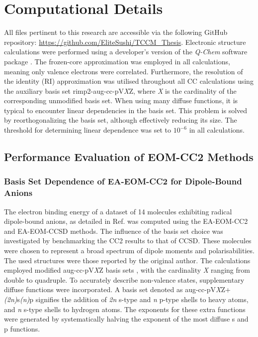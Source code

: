 \chapter{Computational Details}\label{ch:methods}

All files pertinent to this research are accessible via the following GitHub repository: \url{https://github.com/EliteSushi/TCCM_Thesis}. Electronic structure calculations were performed using a developer's version of the \textit{Q-Chem} software package \cite{QChem5}. The frozen-core approximation was employed in all calculations, meaning only valence electrons were correlated. Furthermore, the resolution of the identity (RI) approximation\cite{hattig2000cc2} was utilised throughout all CC calculations using the auxiliary basis set rimp2-aug-cc-pV\textit{X}Z, where \textit{X} is the cardinality of the corresponding unmodified basis set. When using many diffuse functions, it is typical to encounter linear dependencies in the basis set. This problem is solved by reorthogonalizing the basis set, although effectively reducing its size. The threshold for determining linear dependence was set to $\mathrm{10^{-6}}$ in all calculations.\\

\section{Performance Evaluation of EOM-CC2 Methods}

\subsection{Basis Set Dependence of EA-EOM-CC2 for Dipole-Bound Anions} \label{sec:methods:basis}

The electron binding energy of a dataset of 14 molecules exhibiting radical dipole-bound anions, as detailed in Ref.  was computed using the EA-EOM-CC2 and EA-EOM-CCSD methods. The influence of the basis set choice was investigated by benchmarking the CC2 results to that of CCSD. These molecules were chosen to represent a broad spectrum of dipole moments and polarisabilities. The used structures were those reported by the original author. The calculations employed modified aug-cc-pV\textit{X}Z basis sets \cite{dunning1989gaussian}, with the cardinality \textit{X} ranging from double to quadruple. To accurately describe non-valence states, supplementary diffuse functions were incorporated. A basis set denoted as aug-cc-pV\textit{X}Z+\textit{(2n)}s\textit{(n)}p signifies the addition of \textit{2n} s-type and \textit{n} p-type shells to heavy atoms, and \textit{n} s-type shells to hydrogen atoms. The exponents for these extra functions were generated by systematically halving the exponent of the most diffuse s and p functions. \\

